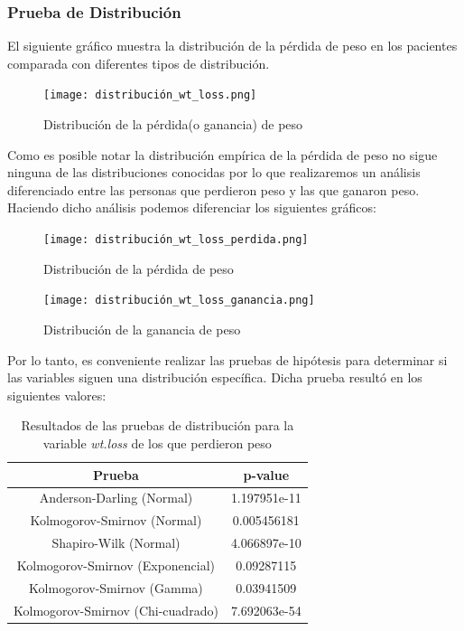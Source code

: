 \documentclass[a4paper,12pt]{article}
\begin{document}
\subsubsection*{Prueba de Distribución}

El siguiente gráfico muestra la distribución de la pérdida de peso en los pacientes comparada con diferentes tipos de distribución.

\begin{figure}[h]
    \centering
    \texttt{[image: distribución\_wt\_loss.png]}
    \caption{Distribución de la pérdida(o ganancia) de peso}
    \label{fig:distribución_wt_loss}
\end{figure}

\newpage

Como es posible notar la distribución empírica de la pérdida de peso no sigue ninguna de las distribuciones conocidas por lo que realizaremos un análisis diferenciado entre las personas que perdieron peso y las que ganaron peso.
Haciendo dicho análisis podemos diferenciar los siguientes gráficos:

\begin{figure}[h]
    \centering
    \texttt{[image: distribución\_wt\_loss\_perdida.png]}
    \caption{Distribución de la pérdida de peso}
    \label{fig:distribución_wt_loss_perdida}
\end{figure}

\begin{figure}[h]
    \centering
    \texttt{[image: distribución\_wt\_loss\_ganancia.png]}
    \caption{Distribución de la ganancia de peso}
    \label{fig:distribución_wt_loss_ganancia}
\end{figure}

\newpage

Por lo tanto, es conveniente realizar las pruebas de hipótesis para determinar si las variables siguen una distribución específica. Dicha prueba resultó en los siguientes valores:

\begin{table}[h!]
    \centering
    \begin{tabular}{|c|c|}
        \hline
        \textbf{Prueba} & \textbf{p-value} \\
        \hline
        Anderson-Darling (Normal) & 1.197951e-11 \\
        \hline
        Kolmogorov-Smirnov (Normal) & 0.005456181 \\
        \hline
        Shapiro-Wilk (Normal) & 4.066897e-10 \\
        \hline
        Kolmogorov-Smirnov (Exponencial) & 0.09287115 \\
        \hline
        Kolmogorov-Smirnov (Gamma) & 0.03941509 \\
        \hline
        Kolmogorov-Smirnov (Chi-cuadrado) & 7.692063e-54 \\
        \hline
    \end{tabular}
    \caption{Resultados de las pruebas de distribución para la variable \textit{wt.loss} de los que perdieron peso}
    \label{tab:pruebas_distribucion_wt_loss_PERDIDA}
\end{table}
\end{document}

